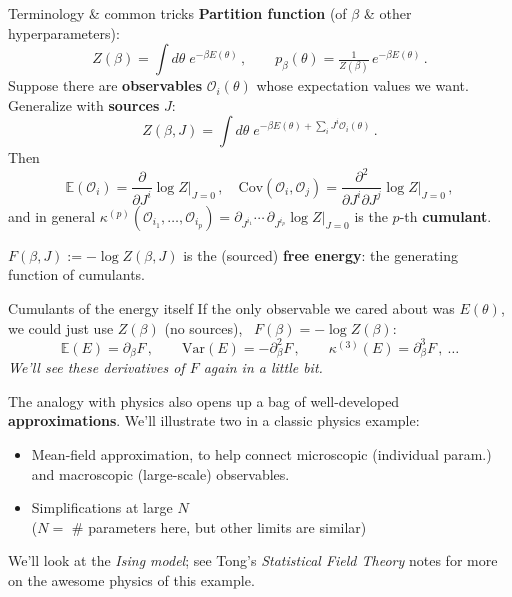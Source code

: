 \documentclass[11pt]{beamer}
\newcommand{\E}{\mathbb{E}}
\newcommand{\pd}{\partial}
\newcommand{\hl}[1]{{\color{blue!60!black}\textbf{#1}}}
\begin{document}
\begin{frame}{Terminology \& common tricks}
  \hl{Partition function} (of $\beta$ \& other hyperparameters):
  \[
    Z(\beta) = \int d\theta\; e^{-\beta E(\theta)}\,,\qquad
    p_\beta(\theta) = \tfrac1{Z(\beta)}\, e^{-\beta E(\theta)}\,.
  \]
  Suppose there are \hl{observables} $\mathcal O_i(\theta)$ whose expectation values
  we want. Generalize with \hl{sources} $J$:
  \[
    Z(\beta, J) = \int d\theta\; e^{-\beta E(\theta) + \sum_i J^i \mathcal O_i(\theta)}\,.
  \]
  Then
  \[
    \E(\mathcal O_i) = \frac{\pd}{\pd J^i}\log Z\Big|_{J=0}\,,\quad
    \mathrm{Cov}(\mathcal O_i, \mathcal O_j) = \frac{\pd^2}{\pd J^i \pd J^j}\log Z\Big|_{J=0}\,,
  \]
  and in general $\displaystyle \kappa^{(p)}(\mathcal O_{i_1},\dots,\mathcal O_{i_p}) =
  \pd_{J^{i_1}}\!\cdots\,\pd_{J^{i_p}} \log Z\big|_{J=0}$ is the $p$-th
  \hl{cumulant}.
  \vspace{2mm}

  $F(\beta, J) := -\log Z(\beta, J)$ is the (sourced) \hl{free energy}:
  the generating function of cumulants.
\end{frame}

\begin{frame}{Cumulants of the energy itself}
  If the only observable we cared about was $E(\theta)$, we could just
  use $Z(\beta)$ (no sources), \ $F(\beta) = -\log Z(\beta)$:
  \[
    \E(E) = \pd_\beta F\,,\qquad
    \mathrm{Var}(E) = -\pd_\beta^2 F\,,\qquad
    \kappa^{(3)}(E) = \pd_\beta^3 F\,,\ \dots
  \]
  \emph{We'll see these derivatives of $F$ again in a little bit.}
  \vspace{6mm}

  The analogy with physics also opens up a bag of well-developed \hl{approximations}. We'll illustrate two in a classic physics example:
  \begin{itemize}
  \item Mean-field approximation, to help connect microscopic (individual param.) and macroscopic (large-scale) observables.
  \item Simplifications at large $N$ \\ ($N=$ \# parameters here, but other limits are similar)
  \end{itemize}
  We'll look at the \emph{Ising model}; see Tong's \emph{Statistical Field Theory} notes for more on the awesome physics of this example.
\end{frame}
\end{document}

